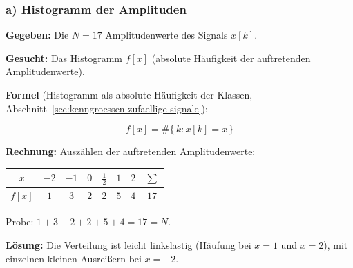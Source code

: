 \subsubsection*{a) Histogramm der Amplituden}

\begin{beispiel}

\textbf{Gegeben:} Die $N = 17$ Amplitudenwerte des Signals $x[k]$.

\textbf{Gesucht:} Das Histogramm $f[x]$ (absolute Häufigkeit der auftretenden
Amplitudenwerte).

\textbf{Formel} (Histogramm als absolute Häufigkeit der Klassen,
Abschnitt~\ref{sec:kenngroessen-zufaellige-signale}):

$$
f[x] = \#\{\, k : x[k] = x \,\}
$$

\textbf{Rechnung:} Auszählen der auftretenden Amplitudenwerte:

\begin{center}
\renewcommand{\arraystretch}{1.2}
\begin{tabular}{c|cccccc|c}
$x$    & $-2$ & $-1$ & $0$ & $\tfrac12$ & $1$ & $2$ & $\sum$ \\
\hline
$f[x]$ & $1$  & $3$  & $2$ & $2$        & $5$ & $4$ & $17$ \\
\end{tabular}
\end{center}

Probe: $1 + 3 + 2 + 2 + 5 + 4 = 17 = N$. \checkmark

\begin{center}
\end{center}

\textbf{Lösung:} Die Verteilung ist leicht linkslastig (Häufung bei $x = 1$ und
$x = 2$), mit einzelnen kleinen Ausreißern bei $x = -2$.

\end{beispiel}

